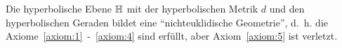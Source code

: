 \begin{satz}%
    Die hyperbolische Ebene $\mathbb{H}$ mit der hyperbolischen Metrik $d$
    und den hyperbolischen Geraden bildet eine \enquote{nichteuklidische Geometrie},
    d.~h. die Axiome~\ref{axiom:1}~-~\ref{axiom:4} sind erfüllt,
    aber Axiom~\ref{axiom:5} ist verletzt.
\end{satz}


